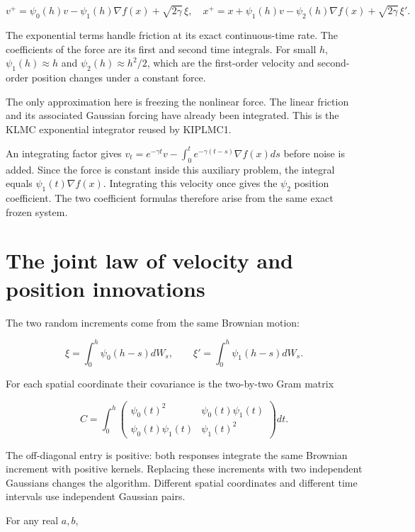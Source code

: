 \documentclass[11pt,a4paper]{report}
\begin{document}
\[v^+=\psi_0(h)v-\psi_1(h)\nabla f(x)+\sqrt{2\gamma}\,\xi,
\quad x^+=x+\psi_1(h)v-\psi_2(h)\nabla f(x)+\sqrt{2\gamma}\,\xi'.\]


The exponential terms handle friction at its exact continuous-time rate.
The coefficients of the force are its first and second time integrals. For
small \(h\), \(\psi_1(h)\approx h\) and \(\psi_2(h)\approx h^2/2\),
which are the first-order velocity and second-order position changes
under a constant force.




The only approximation here is freezing the nonlinear force. The linear
friction and its associated Gaussian forcing have already been integrated.
This is the KLMC exponential integrator reused by KIPLMC1.



An integrating factor gives \(v_t=e^{-\gamma t}v-\int_0^te^{-\gamma(t-s)}\nabla f(x)ds\) before noise is added. Since the force is constant inside this auxiliary problem, the integral equals \(\psi_1(t)\nabla f(x)\). Integrating this velocity once gives the \(\psi_2\) position coefficient. The two coefficient formulas therefore arise from the same exact frozen system.

\section{\texorpdfstring{The joint law of velocity and position innovations}{The joint law of velocity and position innovations}}


The two random increments come from the same Brownian motion:


\[\xi=\int_0^h\psi_0(h-s)dW_s,
\qquad \xi'=\int_0^h\psi_1(h-s)dW_s.\]


For each spatial coordinate their covariance is the two-by-two Gram matrix


\[C=\int_0^h
\begin{pmatrix}\psi_0(t)^2&\psi_0(t)\psi_1(t)\\
\psi_0(t)\psi_1(t)&\psi_1(t)^2\end{pmatrix}dt.\]


The off-diagonal entry is positive: both responses integrate the same Brownian increment with positive kernels. Replacing these increments with
two independent Gaussians changes the algorithm. Different spatial coordinates
and different time intervals use independent Gaussian pairs.




For any real \(a,b\),
\end{document}
